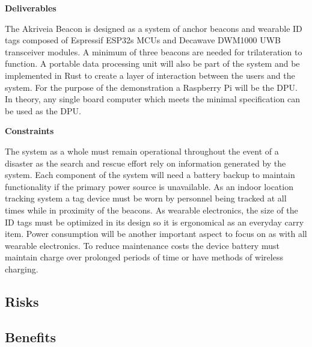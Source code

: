 \bigskip
\textbf{Deliverables}

\medskip
The Akriveia Beacon is designed as a system of anchor beacons and wearable ID tags composed of Espressif ESP32s MCUs and Decawave DWM1000 UWB transceiver modules. A minimum of three beacons are needed for trilateration to function. A portable data processing unit will also be part of the system and be implemented in Rust to create a layer of interaction between the users and the system. For the purpose of the demonstration a Raspberry Pi will be the DPU. In theory, any single board computer which meets the minimal specification can be used as the DPU.

\bigskip
\textbf{Constraints}

\medskip
The system as a whole must remain operational throughout the event of a disaster as the search and rescue effort rely on information generated by the system. Each component of the system will need a battery backup to maintain functionality if the primary power source is unavailable. As an indoor location tracking system a tag device must be worn by personnel being tracked at all times while in proximity of the beacons. As wearable electronics, the size of the ID tags must be optimized in its design so it is ergonomical as an everyday carry item. Power consumption will be another important aspect to focus on as with all wearable electronics. To reduce maintenance costs the device battery must maintain charge over prolonged periods of time or have methods of wireless charging. 



\pagebreak
\subsection{Risks}








\pagebreak
\subsection{Benefits}
\medskip


